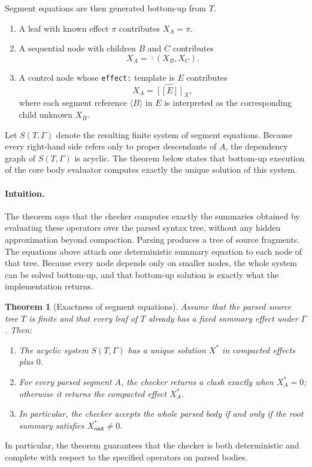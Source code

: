 \documentclass[acmsmall,screen,review,anonymous,nonacm]{acmart}
\newtheorem{theorem}{Theorem}
\newcommand{\compose}{\mathbin{\cdot}}
\newcommand{\sem}[1]{[\![#1]\!]}
\begin{document}
Segment equations are then generated bottom-up from $T$.
\begin{enumerate}
\item A leaf with known effect $\pi$ contributes $X_A = \pi$.
\item A sequential node with children $B$ and $C$ contributes
\[
X_A = \overline{\compose}(X_B,X_C).
\]
\item A control node whose \texttt{effect:} template is $E$ contributes
\[
X_A = \widehat{\sem{E}}_X,
\]
where each segment reference $\langle B \rangle$ in $E$ is interpreted as the corresponding child unknown $X_B$.
\end{enumerate}
Let $S(T,\Gamma)$ denote the resulting finite system of segment equations. Because every right-hand side refers only to proper descendants of $A$, the dependency graph of $S(T,\Gamma)$ is acyclic. The theorem below states that bottom-up execution of the core body evaluator computes exactly the unique solution of this system.

\paragraph{Intuition.}
The theorem says that the checker computes exactly the summaries obtained by evaluating
these operators over the parsed syntax tree, without any hidden approximation beyond
compaction. Parsing produces a tree of source fragments. The equations above attach one
deterministic summary equation to each node of that tree. Because every node depends only
on smaller nodes, the whole system can be solved bottom-up, and that bottom-up solution
is exactly what the implementation returns.

\begin{theorem}[Exactness of segment equations]
\label{thm:segment-equations}
Assume that the parsed source tree $T$ is finite and that every leaf of $T$ already has a fixed summary effect under $\Gamma$. Then:
\begin{enumerate}
\item The acyclic system $S(T,\Gamma)$ has a unique solution $X^\ast$ in compacted effects plus $0$.
\item For every parsed segment $A$, the checker returns a clash exactly when $X^\ast_A = 0$; otherwise it returns the compacted effect $X^\ast_A$.
\item In particular, the checker accepts the whole parsed body if and only if the root summary satisfies $X^\ast_{\mathsf{root}} \neq 0$.
\end{enumerate}
\end{theorem}
In particular, the theorem guarantees that the checker is both deterministic and complete
with respect to the specified operators on parsed bodies.
\end{document}
